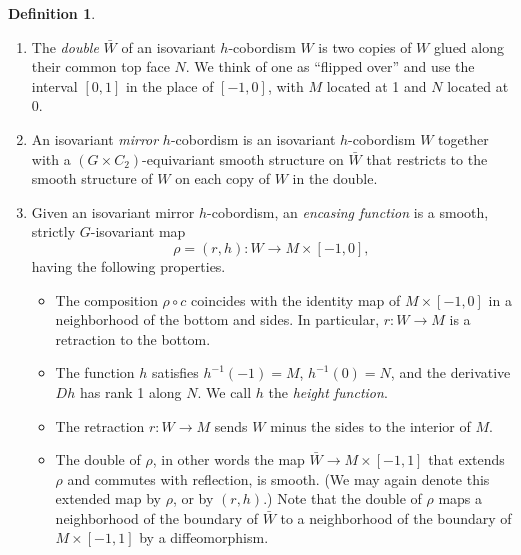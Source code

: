 \documentclass[11pt]{amsart}
\theoremstyle{definition}
\newtheorem{defn}{Definition}[section]
\numberwithin{equation}{section}
\numberwithin{figure}{section}
\newcommand{\mirror}{{mirror}}
\newcommand{\ourdefn}[1]{{\it #1}}
\begin{document}
\begin{defn}\label{def_retract_height} \ %
\begin{enumerate}
	\item The \ourdefn{double} $\bar W$ of an isovariant $h$-cobordism $W$ is two copies of $W$ glued along their common top face $N$. We think of one as ``flipped over'' and use the interval $[0,1]$ in the place of $[-1,0]$, with $M$ located at 1 and $N$ located at 0. 
	\item An isovariant \ourdefn{\mirror} $h$-cobordism is an isovariant $h$-cobordism $W$ together with a $(G \times C_2)$-equivariant smooth structure on $\bar W$ that restricts to the smooth structure of $W$ on each copy of $W$ in the double.
	
	\item Given an isovariant {\mirror} $h$-cobordism, an \ourdefn{encasing function} is a smooth, strictly $G$-isovariant map
	\[ \rho = (r,h)\colon W \to M \times [-1,0], \]
	having the following properties.
	\begin{itemize}
		\item The composition $\rho\circ c$ coincides with the identity map of $M\times [-1,0]$ in a neighborhood of the bottom and sides. In particular, $r:W\to M$ is a retraction to the bottom.
		\item The function $h$ satisfies $h^{-1}(-1) = M$, $h^{-1}(0) = N$, and the derivative $Dh$ has rank 1 along $N$. We call $h$ the \emph{height function}.
		\item The retraction $r\colon W \to M$ sends $W$ minus the sides to the interior of $M$.
		\item The double of $\rho$, in other words the map $\bar W \to M \times [-1,1]$ that extends $\rho$ and commutes with reflection, is smooth. (We may again denote this extended map by $\rho$, or by $(r,h)$.) Note that the double of $\rho$ maps a neighborhood of the boundary of $\bar W$ to a neighborhood of the boundary of $M\times [-1,1]$ by a diffeomorphism. 
	\end{itemize}
\end{enumerate}


\end{defn}
\end{document}

